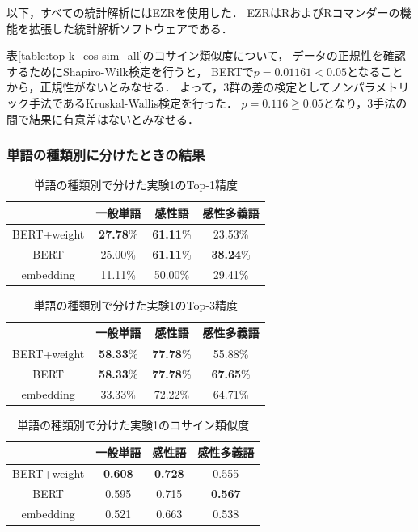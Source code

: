 			以下，すべての統計解析にはEZR\cite{EZR}を使用した．
			EZRはRおよびRコマンダーの機能を拡張した統計解析ソフトウェアである．
			
			表\ref{table:top-k_cos-sim_all}のコサイン類似度について，
			データの正規性を確認するためにShapiro-Wilk検定を行うと，
			BERTで$p=0.01161<0.05$となることから，正規性がないとみなせる．
			よって，3群の差の検定としてノンパラメトリック手法であるKruskal-Wallis検定を行った．
			$p=0.116\geqq0.05$となり，3手法の間で結果に有意差はないとみなせる．
			
		\subsubsection{単語の種類別に分けたときの結果}
			\begin{table}[H]
				\centering
				\caption{単語の種類別で分けた実験1のTop-1精度}
				\label{table:top-1_hinshi}
					\begin{tabular}{cccc}
						\hline
						& 一般単語 & 感性語 & 感性多義語 \\
						\hline \hline
						BERT+weight & \textbf{27.78}\% & \textbf{61.11}\% & 23.53\% \\
						BERT & 25.00\% & \textbf{61.11}\% & \textbf{38.24}\% \\
						embedding & 11.11\% & 50.00\% & 29.41\% \\
						\hline
					\end{tabular}
			\end{table}

			\begin{table}[H]
				\centering
				\caption{単語の種類別で分けた実験1のTop-3精度}
				\label{table:top-3_hinshi}
					\begin{tabular}{cccc}
						\hline
						& 一般単語 & 感性語 & 感性多義語 \\
						\hline \hline
						BERT+weight & \textbf{58.33}\% & \textbf{77.78}\% & 55.88\% \\
						BERT & \textbf{58.33}\% & \textbf{77.78}\% & \textbf{67.65}\% \\
						embedding & 33.33\% & 72.22\% & 64.71\% \\
						\hline
					\end{tabular}
			\end{table}

			\begin{table}[H]
				\centering
				\caption{単語の種類別で分けた実験1のコサイン類似度}
				\label{table:cos_sim_hinshi}
					\begin{tabular}{cccc}
						\hline
						& 一般単語 & 感性語 & 感性多義語 \\
						\hline \hline
						BERT+weight & \textbf{0.608} & \textbf{0.728} & 0.555 \\
						BERT & 0.595 & 0.715 & \textbf{0.567} \\
						embedding & 0.521 & 0.663 & 0.538 \\
						\hline
					\end{tabular}
			\end{table}

